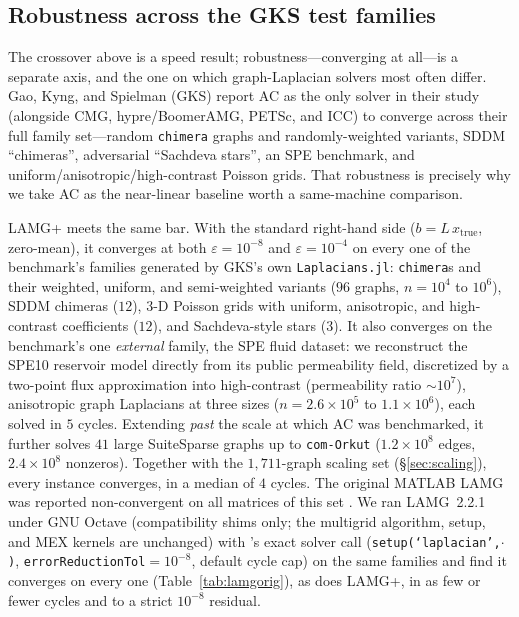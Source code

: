\documentclass[leqno,letterpaper]{etna}
\begin{document}
\subsection{Robustness across the GKS test families}\label{sec:families}
The crossover above is a speed result; robustness---converging at all---is a separate axis, and the
one on which graph-Laplacian solvers most often differ. Gao, Kyng, and Spielman (GKS) \cite{gks2023}
report AC as the only solver in their study (alongside CMG, hypre/BoomerAMG, PETSc, and ICC) to
converge across their full family set---random \texttt{chimera} graphs and randomly-weighted
variants, SDDM ``chimeras'', adversarial ``Sachdeva stars'', an SPE benchmark, and
uniform/anisotropic/high-contrast Poisson grids. That robustness is precisely why we take AC as the
near-linear baseline worth a same-machine comparison.

LAMG+ meets the same bar. With the standard right-hand side ($b=L\,x_{\mathrm{true}}$, zero-mean), it
converges at both $\varepsilon=10^{-8}$ and $\varepsilon=10^{-4}$ on every one of the benchmark's families generated by
GKS's own \texttt{Laplacians.jl}: \texttt{chimera}s and their weighted, uniform, and
semi-weighted variants ($96$ graphs, $n=10^4$ to $10^6$), SDDM chimeras ($12$), $3$-D Poisson grids
with uniform, anisotropic, and high-contrast coefficients ($12$), and Sachdeva-style stars ($3$). It
also converges on the benchmark's one \emph{external} family, the SPE fluid dataset: we reconstruct
the SPE10 reservoir model \cite{christie-blunt} directly from its public permeability field,
discretized by a two-point flux approximation into high-contrast (permeability ratio ${\sim}10^7$),
anisotropic graph Laplacians at three sizes ($n=2.6\times10^5$ to $1.1\times10^6$), each solved in
$5$ cycles. Extending \emph{past} the scale at which AC was benchmarked, it further solves $41$ large
SuiteSparse graphs up to \texttt{com-Orkut} ($1.2\times10^8$ edges, $2.4\times10^8$ nonzeros).
Together with the $1{,}711$-graph scaling set (\S\ref{sec:scaling}), every instance converges, in a
median of $4$ cycles. The original MATLAB LAMG was reported non-convergent on all matrices of this set
\cite{gks2023}. We ran LAMG~2.2.1 under GNU Octave (compatibility shims only; the multigrid
algorithm, setup, and MEX kernels are unchanged) with \cite{gks2023}'s exact solver call
(\texttt{setup(`laplacian',$\cdot$)}, \texttt{errorReductionTol}$=10^{-8}$, default cycle cap) on the
same families and find it converges on every one (Table~\ref{tab:lamgorig}), as does
LAMG+, in as few or fewer cycles and to a strict $10^{-8}$ residual.
\end{document}
